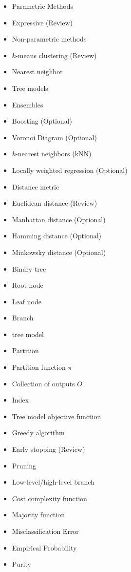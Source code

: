     \begin{itemize}
        \item Parametric Methods
        \item Expressive (Review)
        \item Non-parametric methods
        \item $k$-means clustering (Review)
        \item Nearest neighbor
        \item Tree models
        \item Ensembles
        \item Boosting (Optional)
        \item Voronoi Diagram (Optional)
        \item $k$-nearest neighbors (kNN)
        \item Locally weighted regression (Optional)
        \item Distance metric
        \item Euclidean distance (Review)
        \item Manhattan distance (Optional)
        \item Hamming distance (Optional)
        \item Minkowsky distance (Optional)
        \item Binary tree
        \item Root node
        \item Leaf node
        \item Branch
        \item tree model
        \item Partition
        \item Partition function $\pi$
        \item Collection of outputs $O$
        \item Index
        \item Tree model objective function
        \item Greedy algorithm
        \item Early stopping (Review)
        \item Pruning
        \item Low-level/high-level branch
        \item Cost complexity function
        \item Majority function
        \item Misclassification Error
        \item Empirical Probability
        \item Purity

\end{itemize}
